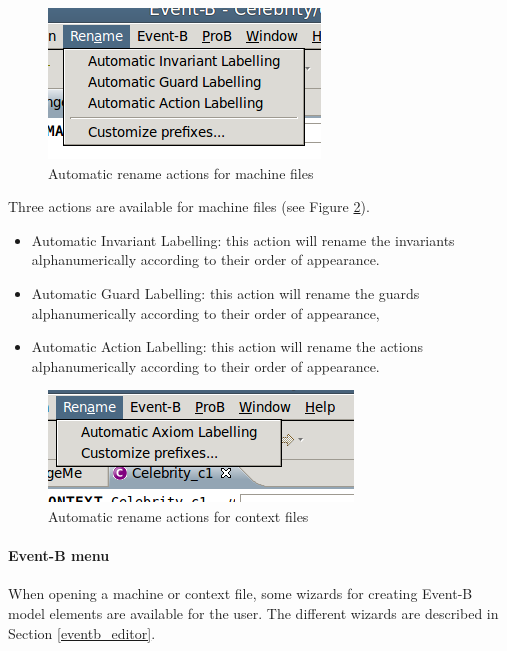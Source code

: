 \begin{figure}[!ht]
\begin{center}
	\includegraphics{img/reference/ref_01_menubar1.png}
	\caption{Automatic rename actions for machine files}
	\label{fig_ref_01_menubar1}
\end{center}
\end{figure}

Three actions are available for machine files (see Figure \ref{fig_ref_01_menubar2}).

    \begin{itemize}
    	\item Automatic Invariant Labelling: this action will rename the invariants alphanumerically according to their order of appearance.
	\item Automatic Guard Labelling: this action will rename the guards alphanumerically according to their order of appearance,
	\item Automatic Action Labelling: this action will rename the actions alphanumerically according to their order of appearance. 
    \end{itemize}

\begin{figure}[!ht]
\begin{center}
	\includegraphics{img/reference/ref_01_menubar2.png}
	\caption{Automatic rename actions for context files}
	\label{fig_ref_01_menubar2}
\end{center}
\end{figure}

\paragraph{Event-B menu}

When opening a machine or context file, some wizards for creating Event-B model elements are available for the user. The different wizards are described in Section \ref{eventb_editor}.

